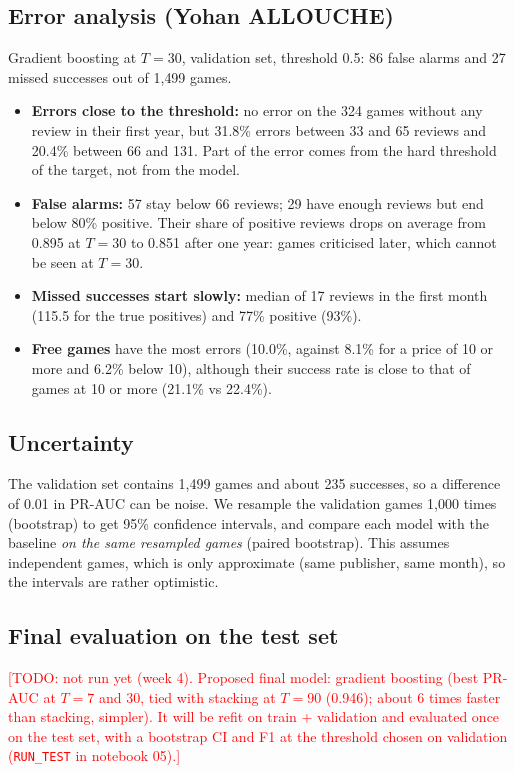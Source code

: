 \documentclass[11pt,a4paper]{article}
\newcommand{\code}[1]{\texttt{#1}}
\newcommand{\TODO}[1]{\textcolor{red}{[TODO: #1]}}
\begin{document}
\subsection{Error analysis (Yohan ALLOUCHE)}
Gradient boosting at $T = 30$, validation set, threshold 0.5: 86 false alarms and 27 missed successes out
of 1{,}499 games.
\begin{itemize}
  \item \textbf{Errors close to the threshold:} no error on the 324 games without any review in their first
        year, but 31.8\% errors between 33 and 65 reviews and 20.4\% between 66 and 131. Part of the error
        comes from the hard threshold of the target, not from the model.
  \item \textbf{False alarms:} 57 stay below 66 reviews; 29 have enough reviews but end below 80\% positive.
        Their share of positive reviews drops on average from 0.895 at $T = 30$ to 0.851 after one year:
        games criticised later, which cannot be seen at $T = 30$.
  \item \textbf{Missed successes start slowly:} median of 17 reviews in the first month (115.5 for the true
        positives) and 77\% positive (93\%).
  \item \textbf{Free games} have the most errors (10.0\%, against 8.1\% for a price of 10 or more and 6.2\%
        below 10), although their success rate is close to that of games at 10 or more (21.1\% vs 22.4\%).
\end{itemize}

\subsection{Uncertainty}
The validation set contains 1{,}499 games and about 235 successes, so a difference of 0.01 in PR-AUC can be
noise. We resample the validation games 1{,}000 times (bootstrap) to get 95\% confidence intervals, and
compare each model with the baseline \emph{on the same resampled games} (paired bootstrap). This assumes
independent games, which is only approximate (same publisher, same month), so the intervals are rather
optimistic.

\subsection{Final evaluation on the test set}
\TODO{not run yet (week 4). Proposed final model: gradient boosting (best PR-AUC at $T = 7$ and $30$, tied
with stacking at $T = 90$ (0.946); about 6 times faster than stacking, simpler). It will be refit on train + validation and evaluated once on the test set, with a bootstrap CI
and F1 at the threshold chosen on validation (\code{RUN\_TEST} in notebook 05).}
\end{document}
